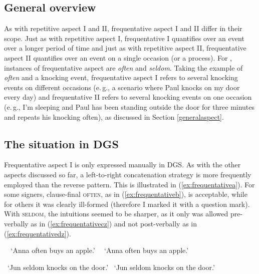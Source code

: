 \subsection{General overview}
As with repetitive aspect I and II, frequentative aspect I and II differ in their scope. Just as with repetitive aspect I, frequentative I quantifies over an event over a longer period of time and just as with repetitive aspect II, frequentative aspect II quantifies over an event on a single occasion (or a process). For \citet{cinque1999adverbs}, instances of frequentative aspect are \textit{often} and \textit{seldom}. Taking the example of \textit{often} and a knocking event, frequentative aspect I refers to several knocking events on different occasions (e.\,g., a scenario where Paul knocks on my door every day) and frequentative II refers to several knocking events on one occasion (e.\,g., I'm sleeping and Paul has been standing outside the door for three minutes and repeats his knocking often), as discussed in Section \ref{generalaspect}.

\subsection{The situation in DGS}
Frequentative aspect I is only expressed manually in DGS. As with the other aspects discussed so far, a left-to-right concatenation strategy is more frequently employed than the reverse pattern. This is illustrated in (\ref{ex:frequentativea}). For some signers, clause-final \textsc{often}, as in (\ref{ex:frequentativeb}), is acceptable, while for others it was clearly ill-formed (therefore I marked it with a question mark). With \textsc{seldom}, the intuitions seemed to be sharper, as it only was allowed pre-verbally as in (\ref{ex:frequentativecz}) and not post-verbally as in (\ref{ex:frequentativedz}).

\begin{exe}
\ex\begin{xlist} 

\glt \textcolor{white}{?*}`Anna often buys an apple.' \label{ex:frequentativea}
\glt \textcolor{white}{?*}`Anna often buys an apple.' \label{ex:frequentativeb}
\end{xlist}
\end{exe} 

\begin{exe}
\ex\label{referbacktome}\begin{xlist} 
\glt \textcolor{white}{*}`Jun seldom knocks on the door.' \label{ex:frequentativecz}
\glt \textcolor{white}{*}`Jun seldom knocks on the door.' \label{ex:frequentativedz}
\end{xlist}
\end{exe}   

